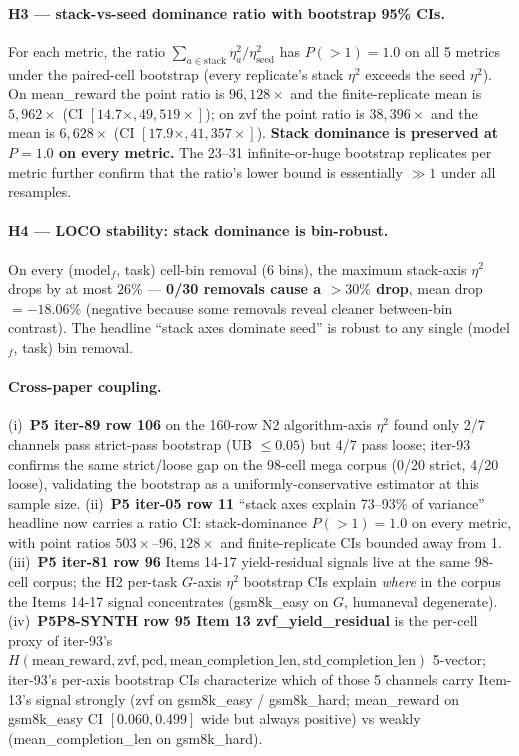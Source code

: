 \paragraph{H3 --- stack-vs-seed dominance ratio with bootstrap 95\% CIs.}
For each metric, the ratio $\sum_{a \in \mathrm{stack}} \eta^2_a /
\eta^2_{\mathrm{seed}}$ has $P(>1) = 1.0$ on all 5 metrics under the
paired-cell bootstrap (every replicate's stack $\eta^2$ exceeds the
seed $\eta^2$). On \textsf{mean\_reward} the point ratio is
$96{,}128\times$ and the finite-replicate mean is $5{,}962\times$
(CI $[14.7\times, 49{,}519\times]$); on \textsf{zvf} the point ratio
is $38{,}396\times$ and the mean is $6{,}628\times$ (CI $[17.9\times,
41{,}357\times]$). \textbf{Stack dominance is preserved at $P{=}1.0$
on every metric.} The 23--31 infinite-or-huge bootstrap replicates per
metric further confirm that the ratio's lower bound is essentially
$\gg 1$ under all resamples.

\paragraph{H4 --- LOCO stability: stack dominance is bin-robust.}
On every (model$_f$, task) cell-bin removal (6 bins), the maximum
stack-axis $\eta^2$ drops by at most $26\%$ --- \textbf{0/30
removals cause a $>30\%$ drop}, mean drop $= -18.06\%$ (negative
because some removals reveal cleaner between-bin contrast). The
headline ``stack axes dominate seed'' is robust to any single
(model$_f$, task) bin removal.

\paragraph{Cross-paper coupling.}
(i)~\textbf{P5 iter-89 row 106} on the 160-row N2 algorithm-axis
$\eta^2$ found only 2/7 channels pass strict-pass bootstrap
(UB $\leq 0.05$) but 4/7 pass loose; iter-93 confirms the same
strict/loose gap on the 98-cell mega corpus (0/20 strict, 4/20
loose), validating the bootstrap as a uniformly-conservative
estimator at this sample size. (ii)~\textbf{P5 iter-05 row 11}
``stack axes explain 73--93\% of variance'' headline now carries a
ratio CI: stack-dominance $P(>1) = 1.0$ on every metric, with
point ratios $503\times$--$96{,}128\times$ and finite-replicate
CIs bounded away from 1. (iii)~\textbf{P5 iter-81 row 96} Items
14-17 yield-residual signals live at the same 98-cell corpus; the
H2 per-task $G$-axis $\eta^2$ bootstrap CIs explain \emph{where}
in the corpus the Items 14-17 signal concentrates (gsm8k\_easy on
$G$, humaneval degenerate). (iv)~\textbf{P5P8-SYNTH row 95 Item 13
zvf\_yield\_residual} is the per-cell proxy of iter-93's
$H(\mathrm{mean\_reward, zvf, pcd, mean\_completion\_len,
std\_completion\_len})$ 5-vector; iter-93's per-axis bootstrap CIs
characterize which of those 5 channels carry Item-13's signal
strongly (zvf on gsm8k\_easy / gsm8k\_hard; mean\_reward on
gsm8k\_easy CI $[0.060, 0.499]$ wide but always positive) vs
weakly (mean\_completion\_len on gsm8k\_hard).

